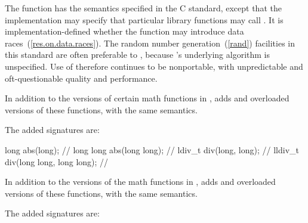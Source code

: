\pnum
The
function has the semantics specified in the C standard, except that the implementation
may specify that particular library functions may call
. It is implementation-defined whether the  function
may introduce data races~(\ref{res.on.data.races}). \enternote The random
number generation~(\ref{rand}) facilities in this standard are often preferable
to , because 's underlying algorithm is unspecified.
Use of  therefore continues to be nonportable, with unpredictable
and oft-questionable quality and performance. \exitnote

\pnum
In addition to the
versions of certain math functions in
,
\Cpp adds
 and 
overloaded versions of these functions, with the same semantics.

\pnum
The added signatures are:
%
%
\begin{codeblock}
long abs(long);                     // 
long long abs(long long);           // 
ldiv_t div(long, long);             // 
lldiv_t div(long long, long long);  // 
\end{codeblock}

\pnum
In addition to the
versions of the math functions in
,
\Cpp adds
and
overloaded versions of these functions, with the same semantics.

\pnum
The added signatures are:

